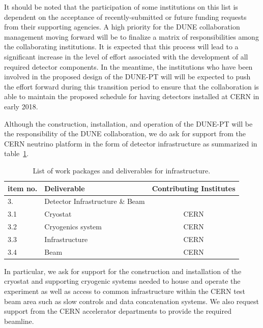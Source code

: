 %
 It should be noted that the participation of some institutions on this list is dependent on 
the acceptance of recently-submitted or future funding requests from their supporting agencies.  A high priority for the DUNE 
collaboration management moving forward will be to finalize a matrix of responsibilities among the collaborating institutions.  It 
is expected that this process will lead to a significant increase in the level of effort associated with the development of all 
required detector components.  In the meantime, the institutions who have been involved in the proposed design of the DUNE-PT will
will be expected to push the effort forward during this transition period to ensure that the collaboration is able to maintain the 
proposed schedule for having detectors installed at CERN in early 2018.

Although the construction, installation, and operation of the DUNE-PT will be the responsibility of the DUNE collaboration, we do 
ask for support from the CERN neutrino platform in the form of detector infrastructure as summarized in table~\ref{tab:wbs-infra}.  
%
\begin{table}[h]
\centering
\begin{tabular}{|l l c|}
\hline
\textbf{item no. } & \textbf{Deliverable}  & \textbf{Contributing Institutes}  \\ \hline

3.   & Detector Infrastructure \& Beam & \\
3.1  & Cryostat &  CERN \\
3.2  & Cryogenics system   &  CERN \\
3.3  & Infrastructure  & CERN \\ 
3.4 & Beam & CERN \\ \hline

\end{tabular}
\caption{List of work packages and deliverables for infrastructure.} 
\label{tab:wbs-infra}
\end{table}
%
In particular, we ask for support for the 
construction and installation of the cryostat and supporting cryogenic systems needed to house and operate the experiment as well 
as access to common infrastructure within the CERN test beam area such as slow controls and data concatenation systems.  We also 
request support from the CERN accelerator departments to provide the required beamline.


